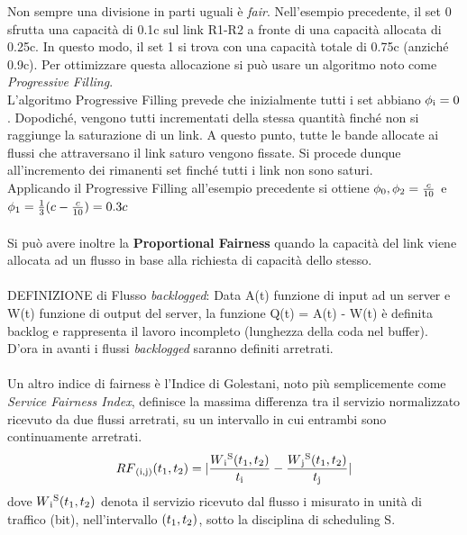 \documentclass{article}
\begin{document}
Non sempre una divisione in parti uguali è \textit{fair}. Nell'esempio precedente, il set 0 sfrutta una capacità di 0.1c sul link R1-R2 a fronte di una capacità allocata di 0.25c. In questo modo, il set 1 si trova con una capacità totale di 0.75c (anziché 0.9c). Per ottimizzare questa allocazione si può usare un algoritmo noto come \textit{Progressive Filling}.\\
L'algoritmo Progressive Filling prevede che inizialmente tutti i set abbiano \(\phi\textsubscript{i}=0\). Dopodiché, vengono tutti incrementati della stessa quantità finché non si raggiunge la saturazione di un link. A questo punto, tutte le bande allocate ai flussi che attraversano il link saturo vengono fissate. Si procede dunque all'incremento dei rimanenti set finché tutti i link non sono saturi.\\
Applicando il Progressive Filling all'esempio precedente si ottiene \( \phi\textsubscript{0}, \phi\textsubscript{2} = \frac{c}{10} \) e \( \phi\textsubscript{1} = \frac{1}{3}(c - \frac{c}{10}) = 0.3c\)\\ \\
Si può avere inoltre la \textbf{Proportional Fairness} quando la capacità del link viene allocata ad un flusso in base alla richiesta di capacità dello stesso.\\ \\
DEFINIZIONE di Flusso \textit{backlogged}: Data A(t) funzione di input ad un server e W(t) funzione di output del server, la funzione Q(t) = A(t) - W(t) è definita backlog e rappresenta il lavoro incompleto (lunghezza della coda nel buffer). D'ora in avanti i flussi \textit{backlogged} saranno definiti arretrati.\\ \\
Un altro indice di fairness è l'Indice di Golestani, noto più semplicemente come \textit{Service Fairness Index}, definisce la massima differenza tra il servizio normalizzato ricevuto da due flussi arretrati, su un intervallo in cui entrambi sono continuamente arretrati.\\
\[
    RF\textsubscript{(i,j)}(t\textsubscript{1}, t\textsubscript{2}) = | \frac{W\textsubscript{i}\textsuperscript{S}(t\textsubscript{1}, t\textsubscript{2})}{t\textsubscript{i}} - \frac{W\textsubscript{j}\textsuperscript{S}(t\textsubscript{1}, t\textsubscript{2})}{t\textsubscript{j}} |
\]
dove \( W\textsubscript{i}\textsuperscript{S}(t\textsubscript{1}, t\textsubscript{2}) \) denota il servizio ricevuto dal flusso i misurato in unità di traffico (bit), nell'intervallo \( (t\textsubscript{1}, t\textsubscript{2}) \), sotto la disciplina di scheduling S.
\end{document}
